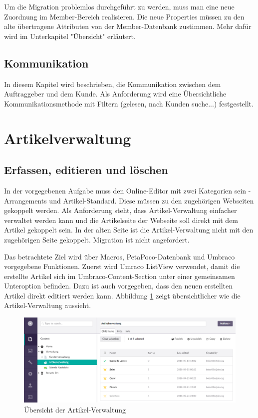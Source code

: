 Um die Migration problemlos durchgeführt zu werden, muss man eine neue Zuordnung im Member-Bereich realisieren. Die neue Properties müssen zu den alte übertragene Attributen von der Member-Datenbank zustimmen. Mehr dafür wird im Unterkapitel "Übersicht" erläutert.  
\subsection{Kommunikation}

In diesem Kapitel wird beschrieben, die Kommunikation zwischen dem Auftraggeber und dem Kunde. Als Anforderung wird eine Übersichtliche Kommunikationsmethode mit Filtern (gelesen, nach Kunden suche...) festgestellt.

\section{Artikelverwaltung}
\subsection{Erfassen, editieren und löschen}

In der vorgegebenen Aufgabe muss den Online-Editor mit zwei Kategorien sein - Arrangements und Artikel-Standard. Diese müssen zu den zugehörigen Webseiten gekoppelt werden. Als Anforderung steht, dass Artikel-Verwaltung einfacher verwaltet werden kann und die Artikelseite der Webseite soll direkt mit dem Artikel gekoppelt sein. In der alten Seite ist die Artikel-Verwaltung nicht mit den zugehörigen Seite gekoppelt. Migration ist nicht angefordert.

Das betrachtete Ziel wird über Macros, PetaPoco-Datenbank und Umbraco vorgegebene Funktionen. Zuerst wird Umraco ListView verwendet, damit die erstellte Artikel sich im Umbraco-Content-Section unter einer gemeinsamen Unteroption befinden. Dazu ist auch vorgegeben, dass den neuen erstellten Artikel direkt editiert werden kann. Abbildung \ref{fig:ArtikelVerwaltung} zeigt übersichtlicher wie die Artikel-Verwaltung aussieht.

\begin{figure}[h]
	\centering
	\includegraphics[width=1\linewidth]{Graphics/ArtikelVerwaltung.png}
	\caption[ArtikelVerwaltung]{Übersicht der Artikel-Verwaltung}
	\label{fig:ArtikelVerwaltung}
\end{figure}

